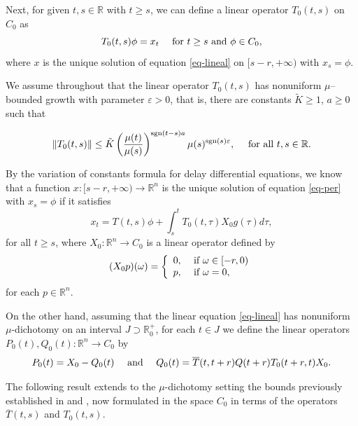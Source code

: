 \documentclass[9pt]{amsart}
\numberwithin{equation}{section}
\numberwithin{lemma}{section}
\begin{document}
Next, for given $t,s\in\mathbb{R}$ with $t\geq s$, we can define a linear operator $T_0(t,s)$ on $C_0$ as
$$T_0(t,s)\phi=x_t \quad \textnormal{ for } t\geq s \textnormal{ and } \phi\in C_0,$$
where $x$ is the unique solution of equation \eqref{eq-lineal} on $[s-r,+\infty)$ with $x_s=\phi$. 

We assume throughout that the linear operator
 $T_0(t,s)$ has nonuniform $\mu$--bounded growth with parameter $\varepsilon>0$, that is, there are constants $\tilde{K}\geq1$, $a\geq0$ such that

\begin{equation}\label{BG}
    \|T_0(t,s)\|\leq \tilde{K}\left(\frac{\mu(t)}{\mu(s)}\right)^{\textnormal{sgn}(t-s)a}\mu(s)^{\textnormal{sgn}(s)\varepsilon}, \quad \textnormal{ for all } t,s\in\mathbb{R}.
\end{equation}

By the variation of constants formula for delay differential equations, we know that a function $x:[s-r,+\infty)\to\mathbb{R}^n$ is the unique solution of equation \eqref{eq-per} with $x_s=\phi$ if it satisfies 
\begin{equation*}
    x_t = T(t,s)\phi + \int_s^t T_0(t,\tau)X_0g(\tau)d\tau,
\end{equation*}
for all $t\geq s$, where $X_0:\mathbb{R}^n\to C_0$ is a linear operator defined by
$$(X_0p)(\omega)=\left\{\begin{array}{rl}
    0, & \textnormal{ if } \omega\in[-r,0) \\
    p, &  \textnormal{ if } \omega=0,
\end{array}\right.$$
for each $p\in\mathbb{R}^n$.

On the other hand, assuming that the linear equation \eqref{eq-lineal} has nonuniform $\mu$-dichotomy on an  interval $J\supset \mathbb{R}_0^{+}$, for each $t\in J$ we define the linear operators $P_0(t), Q_0(t): \mathbb{R}^n\to C_0$ by
$$P_0(t)=X_0-Q_0(t) \quad \textnormal{ and } \quad Q_0(t)=\overline{T}(t,t+r)Q(t+r)T_0(t+r,t)X_0.$$

The following result extends to the $\mu$-dichotomy setting the bounds previously established in \cite[Proposition 4]{BV} and \cite[Proposition 1]{B-v-per}, now formulated in the space $C_0$ in terms of the operators $\overline{T}(t,s)$ and $T_0(t,s)$.
\end{document}
